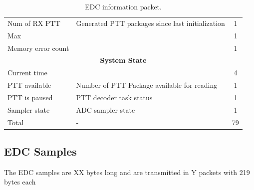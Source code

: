 \begin{table}[!h]
\begin{tabular}{llc}
        Num of RX PTT      & Generated PTT packages since last initialization & 1 \\
        Max                &                                                  & 1 \\
        Memory error count &                                                  & 1 \\
        \midrule
        \multicolumn{3}{c}{\textbf{System State}} \\
        \midrule
        Current time       &                                                  & 4 \\
        PTT available      & Number of PTT Package available for reading      & 1 \\
        PTT is paused      & PTT decoder task status                          & 1 \\
        Sampler state      & ADC sampler state                                & 1 \\
        \midrule
        Total              & -                                                & 79 \\
        \bottomrule[1.5pt]
    \end{tabular}
    \caption{EDC information packet.}
    \label{tab:telemetry-edc}
\end{table}

\subsection{EDC Samples}

The EDC samples are XX bytes long and are transmitted in Y packets with 219 bytes each

